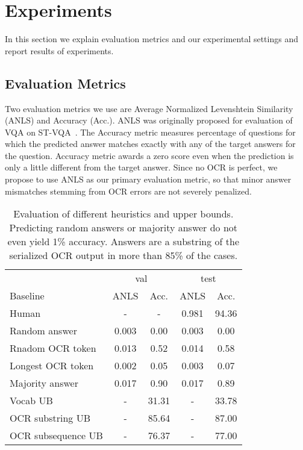 \documentclass[10pt,twocolumn,letterpaper]{article}
\newcommand{\stvqa}{ST-VQA\xspace}
\begin{document}
\section{Experiments}
\label{sec:experiments}
In this section we explain evaluation metrics and our  experimental settings and report results of experiments.
\subsection{Evaluation Metrics}
\label{sec:evaluation}
Two evaluation metrics we use are Average Normalized Levenshtein Similarity (ANLS) and Accuracy (Acc.).
ANLS was originally proposed for evaluation of VQA on \stvqa~\cite{st-vqa_challenge}.
The Accuracy metric measures percentage of questions for which the predicted answer matches exactly with any of the target answers for the question.
Accuracy metric  awards a zero score even when the prediction is only a little different from the target answer. Since no OCR is perfect, we propose to use ANLS as our primary evaluation metric, so that minor answer mismatches stemming from OCR errors are not severely penalized.


\begin{table}[t]
\small
\begin{tabularx}{\linewidth}{X |c c c c}
\toprule
&  \multicolumn{2}{c}{val} & \multicolumn{2}{c}{test} \\             
  Baseline   & ANLS & Acc.  & ANLS & Acc.  \\
\midrule

Human   & - & - & 0.981 & 94.36 \\ 
Random answer   & 0.003 & 0.00 & 0.003 & 0.00 \\  Rnadom OCR token   & 0.013 & 0.52 & 0.014 & 0.58 \\  Longest OCR token     & 0.002 & 0.05 & 0.003 & 0.07 \\  Majority answer  & 0.017 & 0.90 & 0.017 & 0.89 \\  Vocab UB   & - & 31.31 & - & 33.78 \\  

OCR substring UB & - & 85.64 & - & 87.00 \\  OCR subsequence UB & - & 76.37 & - & 77.00 \\ \bottomrule
\end{tabularx}
\caption{Evaluation of different heuristics and upper bounds. Predicting random answers or majority answer do not even yield 1\% accuracy. Answers are a substring of the serialized OCR output in more than 85\% of the cases.}
\label{tab:human_heuristics}
\vspace{-2mm}

\end{table}
\end{document}
